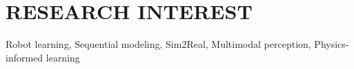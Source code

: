 \documentclass[a4paper,10pt]{extarticle}
\begin{document}

\section*{RESEARCH INTEREST}
Robot learning, Sequential modeling, Sim2Real, Multimodal perception, Physics-informed learning



\end{document}

